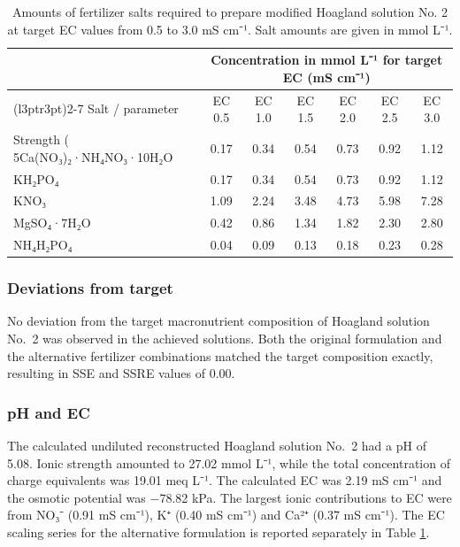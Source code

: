 \documentclass[
  letterpaper,
  DIV=11,
  numbers=noendperiod]{scrreprt}
\begin{document}
\begin{table}[H]
\centering
\caption{\label{tab:tbl-hoagland-ec-series}Amounts of fertilizer salts required to prepare modified Hoagland solution No. 2 at target EC values from 0.5 to 3.0 mS cm⁻¹. Salt amounts are given in mmol L⁻¹.}
\centering
\begin{tabular}[t]{lcccccc}
\toprule
\multicolumn{1}{c}{ } & \multicolumn{6}{c}{Concentration in mmol L⁻¹ for target EC (mS cm⁻¹)} \\
\cmidrule(l{3pt}r{3pt}){2-7}
Salt / parameter & EC 0.5 & EC 1.0 & EC 1.5 & EC 2.0 & EC 2.5 & EC 3.0\\
\midrule
Strength (%
5Ca(NO₃)₂·NH₄NO₃·10H₂O & 0.17 & 0.34 & 0.54 & 0.73 & 0.92 & 1.12\\
KH₂PO₄ & 0.17 & 0.34 & 0.54 & 0.73 & 0.92 & 1.12\\
KNO₃ & 1.09 & 2.24 & 3.48 & 4.73 & 5.98 & 7.28\\
MgSO₄·7H₂O & 0.42 & 0.86 & 1.34 & 1.82 & 2.30 & 2.80\\
\addlinespace
NH₄H₂PO₄ & 0.04 & 0.09 & 0.13 & 0.18 & 0.23 & 0.28\\
\bottomrule
\end{tabular}
\end{table}

\vspace{1.5\baselineskip}

\subsubsection{Deviations from target}\label{deviations-from-target}

No deviation from the target macronutrient composition of Hoagland
solution No.~2 was observed in the achieved solutions. Both the original
formulation and the alternative fertilizer combinations matched the
target composition exactly, resulting in SSE and SSRE values of 0.00.

\subsubsection{pH and EC}\label{ph-and-ec}

The calculated undiluted reconstructed Hoagland solution No.~2 had a pH
of 5.08. Ionic strength amounted to 27.02 mmol L⁻¹, while the total
concentration of charge equivalents was 19.01 meq L⁻¹. The calculated EC
was 2.19 mS cm⁻¹ and the osmotic potential was −78.82 kPa. The largest
ionic contributions to EC were from NO₃⁻ (0.91 mS cm⁻¹), K⁺ (0.40 mS
cm⁻¹) and Ca²⁺ (0.37 mS cm⁻¹). The EC scaling series for the alternative
formulation is reported separately in Table
\ref{tab:tbl-hoagland-ec-series}.
\end{document}

